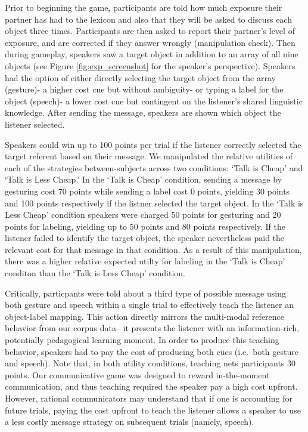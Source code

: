 \documentclass[10pt, letterpaper]{article}
\begin{document}
Prior to beginning the game, participants are told how much exposure
their partner has had to the lexicon and also that they will be asked to
discuss each object three times. Participants are then asked to report
their partner's level of exposure, and are corrected if they answer
wrongly (manipulation check). Then during gameplay, speakers saw a
target object in addition to an array of all nine objects (see Figure
\ref{fig:exp_screenshot} for the speaker's perspective). Speakers had
the option of either directly selecting the target object from the array
(gesture)- a higher cost cue but without ambiguity- or typing a label
for the object (speech)- a lower cost cue but contingent on the
listener's shared linguistic knowledge. After sending the message,
speakers are shown which object the listener selected.

Speakers could win up to 100 points per trial if the listener correctly
selected the target referent based on their message. We manipulated the
relative utilities of each of the strategies between-subjects across two
conditions: `Talk is Cheap' and `Talk is Less Cheap.' In the `Talk is
Cheap' condition, sending a message by gesturing cost 70 points while
sending a label cost 0 points, yielding 30 points and 100 points
respectively if the listner selected the target object. In the `Talk is
Less Cheap' condition speakers were charged 50 points for gesturing and
20 points for labeling, yielding up to 50 points and 80 points
respectively. If the listener failed to identify the target object, the
speaker nevertheless paid the relevant cost for that message in that
condition. As a result of this manipulation, there was a higher relative
expected utilty for labeling in the `Talk is Cheap' conditon than the
`Talk is Less Cheap' condition.

Critically, particpants were told about a third type of possible message
using both gesture and speech within a single trial to effectively teach
the listener an object-label mapping. This action directly mirrors the
multi-modal reference behavior from our corpus data-- it presents the
listener with an information-rich, potentially pedagogical learning
moment. In order to produce this teaching behavior, speakers had to pay
the cost of producing both cues (i.e.~both gesture and speech). Note
that, in both utility conditions, teaching nets participants 30 points.
Our communicative game was designed to reward in-the-moment
communication, and thus teaching required the speaker pay a high cost
upfront. However, rational communicators may understand that if one is
accounting for future trials, paying the cost upfront to teach the
listener allows a speaker to use a less costly message strategy on
subsequent trials (namely, speech).
\end{document}

